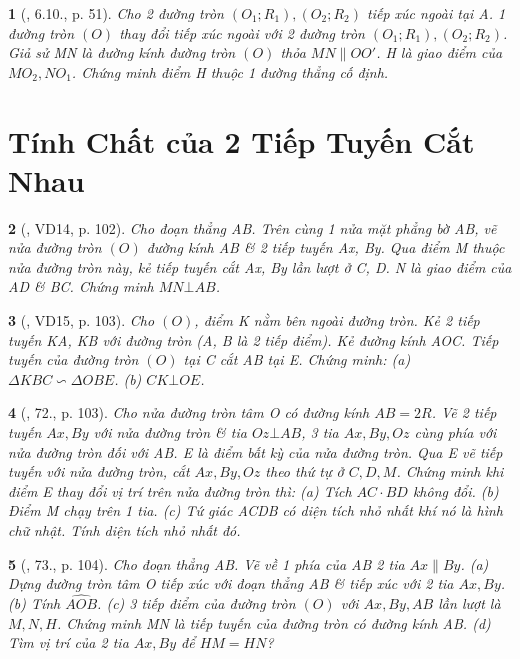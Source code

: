 \documentclass{article}
\newtheorem{baitoan}{}
\begin{document}
\begin{baitoan}[\cite{TLCT_THCS_Toan_9_hinh_hoc}, 6.10., p. 51]
	Cho 2 đường tròn $(O_1;R_1),(O_2;R_2)$ tiếp xúc ngoài tại A. 1 đường tròn $(O)$ thay đổi tiếp xúc ngoài với 2 đường tròn $(O_1;R_1),(O_2;R_2)$. Giả sử MN là đường kính đường tròn $(O)$ thỏa $MN\parallel OO'$. H là giao điểm của $MO_2,NO_1$. Chứng minh điểm H thuộc 1 đường thẳng cố định.
\end{baitoan}


\section{Tính Chất của 2 Tiếp Tuyến Cắt Nhau}

\begin{baitoan}[\cite{Binh_Toan_9_tap_1}, VD14, p. 102]
	Cho đoạn thẳng AB. Trên cùng 1 nửa mặt phẳng bờ AB, vẽ nửa đường tròn $(O)$ đường kính AB \& 2 tiếp tuyến Ax, By. Qua điểm M thuộc nửa đường tròn này, kẻ tiếp tuyến cắt Ax, By lần lượt ở C, D. N là giao điểm của AD \& BC. Chứng minh $MN\bot AB$.
\end{baitoan}

\begin{baitoan}[\cite{Binh_Toan_9_tap_1}, VD15, p. 103]
	Cho $(O)$, điểm K nằm bên ngoài đường tròn. Kẻ 2 tiếp tuyến KA, KB với đường tròn (A, B là 2 tiếp điểm). Kẻ đường kính AOC. Tiếp tuyến của đường tròn $(O)$ tại C cắt AB tại E. Chứng minh: (a) $\Delta KBC\backsim\Delta OBE$. (b) $CK\bot OE$.
\end{baitoan}

\begin{baitoan}[\cite{Binh_Toan_9_tap_1}, 72., p. 103]
	Cho nửa đường tròn tâm O có đường kính $AB = 2R$. Vẽ 2 tiếp tuyến $Ax,By$ với nửa đường tròn \& tia $Oz\bot AB$, 3 tia $Ax,By,Oz$ cùng phía với nửa đường tròn đối với AB. E là điểm bất kỳ của nửa đường tròn. Qua E vẽ tiếp tuyến với nửa đường tròn, cắt $Ax,By,Oz$ theo thứ tự ở $C,D,M$. Chứng minh khi điểm E thay đổi vị trí trên nửa đường tròn thì: (a) Tích $AC\cdot BD$ không đổi. (b) Điểm M chạy trên 1 tia. (c) Tứ giác ACDB có diện tích nhỏ nhất khí nó là hình chữ nhật. Tính diện tích nhỏ nhất đó.
\end{baitoan}

\begin{baitoan}[\cite{Binh_Toan_9_tap_1}, 73., p. 104]
	Cho đoạn thẳng AB. Vẽ về 1 phía của AB 2 tia $Ax\parallel By$. (a) Dựng đường tròn tâm O tiếp xúc với đoạn thẳng AB \& tiếp xúc với 2 tia $Ax,By$. (b) Tính $\widehat{AOB}$. (c) 3 tiếp điểm của đường tròn $(O)$ với $Ax,By,AB$ lần lượt là $M,N,H$. Chứng minh MN là tiếp tuyến của đường tròn có đường kính AB. (d) Tìm vị trí của 2 tia $Ax,By$ để $HM = HN$?
\end{baitoan}
\end{document}
